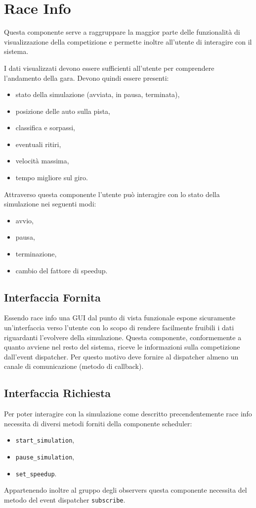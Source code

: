 \documentclass[11pt,a4paper]{report}
\newcommand{\fun}[1]{\texttt{#1}}
\begin{document}
\section{Race Info}
Questa componente serve a raggruppare la maggior parte delle funzionalità di visualizzazione della competizione e permette inoltre all'utente di interagire con il sistema.

I dati visualizzati devono essere sufficienti all'utente per comprendere l'andamento della gara. Devono quindi essere presenti:
\begin{itemize}
\item stato della simulazione (avviata, in pausa, terminata),
\item posizione delle auto sulla pista,
\item classifica e sorpassi,
\item eventuali ritiri,
\item velocità massima,
\item tempo migliore sul giro.
\end{itemize}
Attraverso questa componente l'utente può interagire con lo stato della simulazione nei seguenti modi:
\begin{itemize}
\item avvio,
\item pausa,
\item terminazione,
\item cambio del fattore di speedup.
\end{itemize}
\subsection*{Interfaccia Fornita}
Essendo race info una GUI dal punto di vista funzionale espone sicuramente un'interfaccia verso l'utente con lo scopo di rendere facilmente fruibili i dati riguardanti l'evolvere della simulazione.
Questa componente, conformemente a quanto avviene nel resto del sistema, riceve le informazioni sulla competizione dall'event dispatcher. Per questo motivo deve fornire al dispatcher almeno un canale di comunicazione (metodo di callback).
\subsection*{Interfaccia Richiesta}
Per poter interagire con la simulazione come descritto precendentemente race info necessita di diversi metodi forniti della componente scheduler:
\begin{itemize}
\item \fun{start\_simulation},
\item \fun{pause\_simulation},
\item \fun{set\_speedup}.
\end{itemize}
Appartenendo inoltre al gruppo degli observers questa componente necessita del metodo del event dispatcher \fun{subscribe}.
\end{document}
